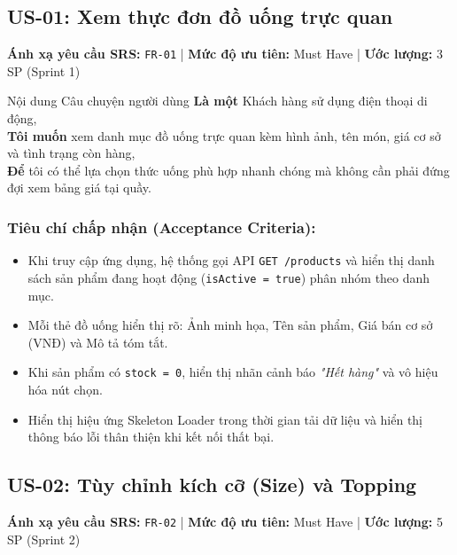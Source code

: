 \documentclass[12pt,a4paper]{article}
\begin{document}
\subsection{US-01: Xem thực đơn đồ uống trực quan}
\textbf{Ánh xạ yêu cầu SRS:} \texttt{FR-01} \quad | \quad \textbf{Mức độ ưu tiên:} Must Have \quad | \quad \textbf{Ước lượng:} 3 SP (Sprint 1)

\begin{storybox}{Nội dung Câu chuyện người dùng}
\textbf{Là một} Khách hàng sử dụng điện thoại di động,\\
\textbf{Tôi muốn} xem danh mục đồ uống trực quan kèm hình ảnh, tên món, giá cơ sở và tình trạng còn hàng,\\
\textbf{Để} tôi có thể lựa chọn thức uống phù hợp nhanh chóng mà không cần phải đứng đợi xem bảng giá tại quầy.
\end{storybox}

\subsubsection*{Tiêu chí chấp nhận (Acceptance Criteria):}
\begin{itemize}[noitemsep]
    \item[\textbf{AC-01.1}] Khi truy cập ứng dụng, hệ thống gọi API \texttt{GET /products} và hiển thị danh sách sản phẩm đang hoạt động (\texttt{isActive = true}) phân nhóm theo danh mục.
    \item[\textbf{AC-01.2}] Mỗi thẻ đồ uống hiển thị rõ: Ảnh minh họa, Tên sản phẩm, Giá bán cơ sở (VNĐ) và Mô tả tóm tắt.
    \item[\textbf{AC-01.3}] Khi sản phẩm có \texttt{stock = 0}, hiển thị nhãn cảnh báo \textit{"Hết hàng"} và vô hiệu hóa nút chọn.
    \item[\textbf{AC-01.4}] Hiển thị hiệu ứng Skeleton Loader trong thời gian tải dữ liệu và hiển thị thông báo lỗi thân thiện khi kết nối thất bại.
\end{itemize}

\vspace{0.3cm}
\subsection{US-02: Tùy chỉnh kích cỡ (Size) và Topping}
\textbf{Ánh xạ yêu cầu SRS:} \texttt{FR-02} \quad | \quad \textbf{Mức độ ưu tiên:} Must Have \quad | \quad \textbf{Ước lượng:} 5 SP (Sprint 2)
\end{document}
